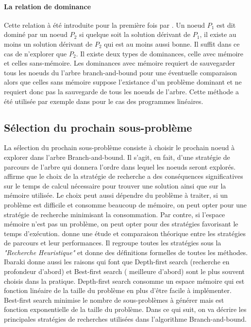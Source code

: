 \documentclass[12pt,a4paper,oneside]{book}
\theoremstyle{definition}
\begin{document}
	\paragraph{La relation de dominance}
	Cette relation à été introduite pour la première fois par \cite{Kohler1974}. Un noeud $P_1$ est dit dominé par un noeud $P_2$ si quelque soit la solution dérivant de $P_1$, il existe au moins un solution dérivant de $P_2$ qui est au moins aussi bonne. Il suffit dans ce cas  de n'explorer que $P_2$. Il existe deux types de dominances, celle avec mémoire et celles sans-mémoire. Les dominances avec mémoire requiert de sauvegarder tous les noeuds du l'arbre branch-and-bound pour une éventuelle comparaison alors que celles sans mémoire suppose l'existance d'un problème dominant et ne requiert donc pas la sauvegarde de tous les noeuds de l'arbre. Cette méthode a été utilisée par exemple dans \cite{fischetti2010pruning} pour le cas des programmes linéaires.
	
	\subsection{Sélection du prochain sous-problème}
	La sélection du prochain sous-problème consiste à choisir le prochain noeud à explorer dans l'arbre Branch-and-bound. Il s'agit, en fait, d'une stratégie de parcours de l'arbre qui donnera l'ordre dans lequel les noeuds seront explorés. \cite{MORRISON201679} affirme que le choix de la stratégie de recherche a des conséquences significatives sur le temps de calcul nécessaire pour trouver une solution ainsi que sur la mémoire utilisée. Le choix peut aussi dépendre du problème à traiter, si un problème est difficile et consomme beaucoup de mémoire, on peut opter pour une stratégie de recherche minimisant la consommation. Par contre, si l'espace mémoire n'est pas un problème, on peut opter pour des stratégies favorisant le temps d'exécution. \cite{Ibaraki1976} donne une étude et comparaison théorique entre les stratégies de parcours et leur performances. Il regroupe toutes les stratégies sous la \textit{"Recherche Heuristique"} et donne des définitions formelles de toutes les méthodes. Ibaraki donne aussi les raisons qui font que Depth-first search (recherche en profondeur d'abord) et Best-first search ( meilleure d'abord) sont le plus souvent choisis dans la pratique. Depth-first search consomme un espace mémoire qui est fonction linéaire de la taille du problème en plus d'être facile à implémenter. Best-first search minimise le nombre de sous-problèmes à générer mais est fonction exponentielle de la taille du problème. Dans ce qui suit, on va décrire les principales stratégies de recherches utilisées dans l'algorithme Branch-and-bound.
	
\end{document}
